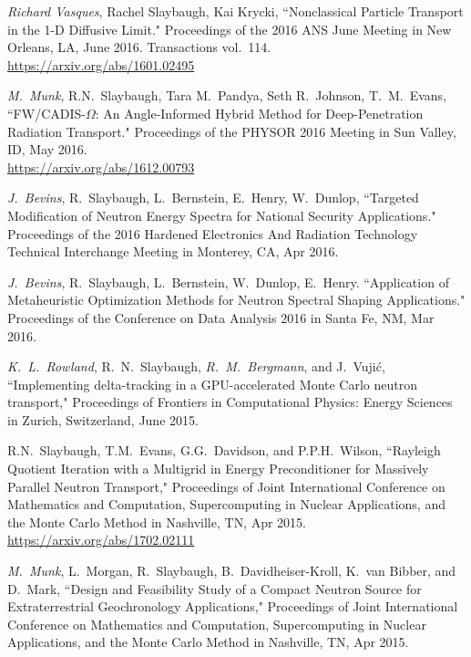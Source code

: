 \begin{bibsection}
\item \textit{Richard Vasques}, Rachel Slaybaugh, Kai Krycki, ``Nonclassical Particle Transport in the 1-D Diffusive Limit." Proceedings of the 2016 ANS June Meeting in New Orleans, LA, June 2016. Transactions vol.\ 114.\\
\url{https://arxiv.org/abs/1601.02495}

\item \textit{M.\ Munk}, R.N.\ Slaybaugh, Tara M.~Pandya, Seth R.~Johnson, T.~M.~Evans, ``FW/CADIS-$\Omega$: An Angle-Informed Hybrid Method for Deep-Penetration Radiation Transport." Proceedings of the PHYSOR 2016 Meeting in Sun Valley, ID, May 2016.\\
\url{https://arxiv.org/abs/1612.00793}

\item \textit{J.\ Bevins}, R.\ Slaybaugh, L.\ Bernstein, E.\ Henry, W.\ Dunlop, ``Targeted Modification of Neutron Energy Spectra for National Security Applications." Proceedings of the 2016 Hardened Electronics And Radiation Technology Technical Interchange Meeting in Monterey, CA, Apr 2016. 

\item \textit{J.\ Bevins}, R.\ Slaybaugh, L.\ Bernstein, W.\ Dunlop, E.\ Henry. ``Application of Metaheuristic Optimization Methods for Neutron Spectral Shaping Applications." Proceedings of the Conference on Data Analysis 2016 in Santa Fe, NM, Mar 2016. 

\item \textit{K.\ L.\ Rowland}, R.\ N.\ Slaybaugh, \textit{R.\ M.\ Bergmann}, and J.\ Vuji\'c, ``Implementing delta-tracking in a GPU-accelerated Monte Carlo neutron transport," Proceedings of Frontiers in Computational Physics: Energy Sciences in Zurich, Switzerland, June 2015. 

\item  R.N.\ Slaybaugh, T.M.\ Evans, G.G.\ Davidson, and P.P.H.\ Wilson, ``Rayleigh Quotient Iteration with a Multigrid in Energy Preconditioner for Massively Parallel Neutron Transport," Proceedings of Joint International Conference on Mathematics and Computation, Supercomputing in Nuclear Applications, and the Monte Carlo Method in Nashville, TN, Apr 2015.\\
\url{https://arxiv.org/abs/1702.02111}

\item  \textit{M.\ Munk}, L.\ Morgan, R.\ Slaybaugh, B.\ Davidheiser-Kroll, K.\ van Bibber, and D.\ Mark, ``Design and Feasibility Study of a Compact Neutron Source for Extraterrestrial Geochronology Applications," Proceedings of Joint International Conference on Mathematics and Computation, Supercomputing in Nuclear Applications, and the Monte Carlo Method in Nashville, TN, Apr 2015.


\end{bibsection}

